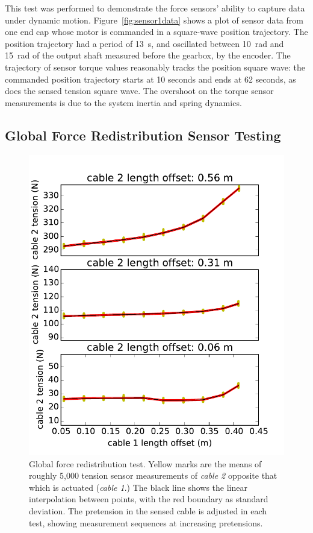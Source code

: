 This test was performed to demonstrate the force sensors' ability to capture data under dynamic motion.
Figure~\ref{fig:sensor1data} shows a plot of sensor data from one end cap whose motor is commanded in a square-wave position trajectory.
The position trajectory had a period of \SI{13}{\second}, and oscillated between \SI{10}{\radian} and \SI{15}{\radian} of the output shaft measured before the gearbox, by the encoder.
The trajectory of sensor torque values reasonably tracks the position square wave: the commanded position trajectory starts at 10 seconds and ends at 62 seconds, as does the sensed tension square wave.
The overshoot on the torque sensor measurements is due to the system inertia and spring dynamics.

\subsection{Global Force Redistribution Sensor Testing}

\begin{figure}[thpb]
      \centering
      \includegraphics[width=0.55\columnwidth]{tex/img/sensor2_original}
      \caption{Global force redistribution test. Yellow marks are the means of roughly 5,000 tension sensor measurements of \emph{cable 2} opposite that which is actuated (\emph{cable 1}.) The black line shows the linear interpolation between points, with the red boundary as standard deviation. The pretension in the sensed cable is adjusted in each test, showing measurement sequences at increasing pretensions.}
      \label{fig:sensor2data_forcedistribution}
\end{figure}

